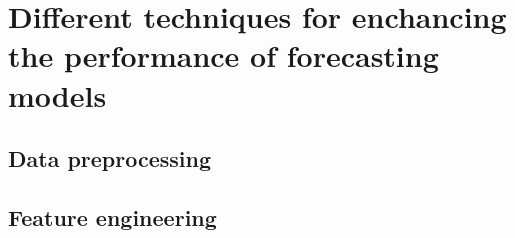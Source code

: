 \section{Different techniques for enchancing the performance of forecasting models}
\subsection{Data preprocessing}

\subsection{Feature engineering}

